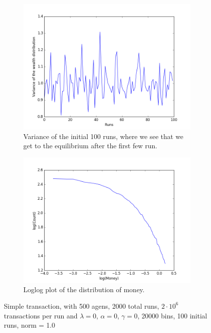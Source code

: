 \documentclass[a4paper,11pt]{article}
\begin{document}
{\begin{figure}[H]
	\centering
	\begin{subfigure}[t]{0.45\textwidth}
		\includegraphics[scale=0.4]{propersimpleinit}
		\caption{Variance of the initial 100 runs, where we see that we get to the equilibrium after the first few run.}
		\label{fig:propersimpleinit}
	\end{subfigure}
	\begin{subfigure}[t]{0.45\textwidth}
		\includegraphics[scale=0.4]{Proper_simple_transaction_log}
		\caption{Loglog plot of the distribution of money. }
		\label{fig:Proper_simple_transaction_log}
	\end{subfigure}
	\caption{Simple transaction, with 500 agens, 2000 total runs, $2\cdot 10^{6}$ transactions per run and  $\lambda=0$, $\alpha=0$, $\gamma=0$, 20000 bins, 100 initial runs, norm = 1.0}
	\label{fig:simple}
\end{figure}







}
\end{document}
